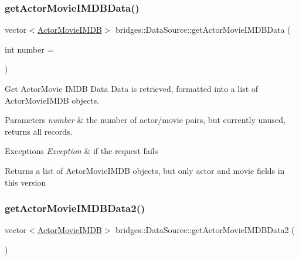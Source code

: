 \subsubsection{\texorpdfstring{get\+Actor\+Movie\+I\+M\+D\+B\+Data()}{getActorMovieIMDBData()}}
{\footnotesize\ttfamily vector$<$\hyperlink{classbridges_1_1dataset_1_1_actor_movie_i_m_d_b}{Actor\+Movie\+I\+M\+DB}$>$ bridges\+::\+Data\+Source\+::get\+Actor\+Movie\+I\+M\+D\+B\+Data (\begin{DoxyParamCaption}\item[{int}]{number = {} }\end{DoxyParamCaption})\hspace{0.3cm}{\ttfamily [inline]}}



Get Actor\+Movie I\+M\+DB Data Data is retrieved, formatted into a list of Actor\+Movie\+I\+M\+DB objects. 


\begin{DoxyParams}{Parameters}
{\em number} & the number of actor/movie pairs, but currently unused, returns all records. \\
\hline
\end{DoxyParams}

\begin{DoxyExceptions}{Exceptions}
{\em Exception} & if the request fails\\
\hline
\end{DoxyExceptions}
\begin{DoxyReturn}{Returns}
a list of Actor\+Movie\+I\+M\+DB objects, but only actor and movie fields in this version 
\end{DoxyReturn}
\mbox{\label{classbridges_1_1_data_source_a00f0a0a1871d4864c6ccdd04195e0fb2}} 
\subsubsection{\texorpdfstring{get\+Actor\+Movie\+I\+M\+D\+B\+Data2()}{getActorMovieIMDBData2()}}
{\footnotesize\ttfamily vector$<$\hyperlink{classbridges_1_1dataset_1_1_actor_movie_i_m_d_b}{Actor\+Movie\+I\+M\+DB}$>$ bridges\+::\+Data\+Source\+::get\+Actor\+Movie\+I\+M\+D\+B\+Data2 (\begin{DoxyParamCaption}{ }\end{DoxyParamCaption})\hspace{0.3cm}{\ttfamily [inline]}}




